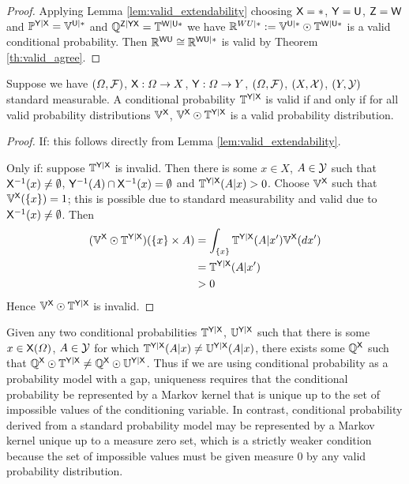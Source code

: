 \begin{proof}
Applying Lemma \ref{lem:valid_extendability} choosing $\mathsf{X}=*$, $\mathsf{Y}=\mathsf{U}$, $\mathsf{Z}=\mathsf{W}$ and $\mathbb{P}^{\mathsf{Y}|\mathsf{X}}=\mathbb{V}^{\mathsf{U}|*}$ and $\mathbb{Q}^{\mathsf{Z}|\mathsf{YX}}=\mathbb{T}^{\mathsf{W}|\mathsf{U*}}$ we have $\mathbb{R}^{WU|*}:=\mathbb{V}^{\mathsf{U}|*}\odot \mathbb{T}^{\mathsf{W}|\mathsf{U}*}$ is a valid conditional probability. Then $\mathbb{R}^{\mathsf{WU}}\cong \mathbb{R}^{\mathsf{WU}|*}$ is valid by Theorem \ref{th:valid_agree}.
\end{proof}

\begin{theorem}
Suppose we have $(\Omega,\mathcal{F})$, $\mathsf{X}:\Omega\to X$, $\mathsf{Y}:\Omega\to Y$, $(\Omega,\mathcal{F})$, $(X,\mathcal{X})$, $(Y,\mathcal{Y})$ standard measurable. A conditional probability $\mathbb{T}^{\mathsf{Y}|\mathsf{X}}$ is valid if and only if for all valid probability distributions $\mathbb{V}^{\mathsf{X}}$, $\mathbb{V}^{\mathsf{X}}\odot \mathbb{T}^{\mathsf{Y}|\mathsf{X}}$ is a valid probability distribution.
\end{theorem}

\begin{proof}
If: this follows directly from Lemma \ref{lem:valid_extendability}.

Only if: suppose $\mathbb{T}^{\mathsf{Y}|\mathsf{X}}$ is invalid. Then there is some $x\in X$, $A\in \mathcal{Y}$ such that $\mathsf{X}^{-1}(x)\neq \emptyset$, $\mathsf{Y}^{-1}(A)\cap\mathsf{X}^{-1}(x)=\emptyset$ and $\mathbb{T}^{\mathsf{Y}|\mathsf{X}}(A|x)>0$. Choose $\mathbb{V}^{\mathsf{X}}$ such that $\mathbb{V}^{\mathsf{X}}(\{x\})=1$; this is possible due to standard measurability and valid due to $\mathsf{X}^{-1}(x)\neq \emptyset$. Then
\begin{align}
	(\mathbb{V}^{\mathsf{X}}\odot \mathbb{T}^{\mathsf{Y}|\mathsf{X}})(\{x\}\times A) &= \int_{\{x\}} \mathbb{T}^{\mathsf{Y}|\mathsf{X}}(A|x') \mathbb{V}^{\mathsf{X}}(dx')\\
																	 &= \mathbb{T}^{\mathsf{Y}|\mathsf{X}}(A|x')\\
																	 &>0
\end{align}
Hence $\mathbb{V}^{\mathsf{X}}\odot \mathbb{T}^{\mathsf{Y}|\mathsf{X}}$ is invalid.
\end{proof}

Given any two conditional probabilities $\mathbb{T}^{\mathsf{Y}|\mathsf{X}}$, $ \mathbb{U}^{\mathsf{Y}|\mathsf{X}}$ such that there is some $x\in \mathsf{X}(\Omega)$, $A\in \mathcal{Y}$ for which $\mathbb{T}^{\mathsf{Y}|\mathsf{X}}(A|x)\neq \mathbb{U}^{\mathsf{Y}|\mathsf{X}}(A|x)$, there exists some $\mathbb{Q}^{\mathsf{X}}$ such that $\mathbb{Q}^{\mathsf{X}}\odot \mathbb{T}^{\mathsf{Y}|\mathsf{X}}\neq \mathbb{Q}^{\mathsf{X}}\odot \mathbb{U}^{\mathsf{Y}|\mathsf{X}}$. Thus if we are using conditional probability as a probability model with a gap, uniqueness requires that the conditional probability be represented by a Markov kernel that is unique up to the set of impossible values of the conditioning variable. In contrast, conditional probability derived from a standard probability model may be represented by a Markov kernel unique up to a measure zero set, which is a strictly weaker condition because the set of impossible values must be given measure 0 by any valid probability distribution.

